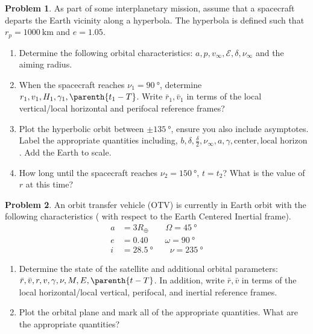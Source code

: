 \documentclass[10pt]{article}
\theoremstyle{definition}
\newtheorem{prob}{Problem}[section]
\newenvironment{subprob}%
{\renewcommand{\theenumi}{\alph{enumi}}\renewcommand{\labelenumi}{(\theenumi)}\begin{enumerate}}%
{\end{enumerate}}%
\begin{document}
\begin{prob}
    As part of some interplanetary mission, assume that a spacecraft departs the Earth vicinity along a hyperbola.
    The hyperbola is defined such that \( r_p = \SI{1000}{\kilo\meter} \) and \( e  = 1.05\).

    \begin{subprob}
        \item Determine the following orbital characteristics: \( a, p, v_\infty, \mathcal{E}, \delta, \nu_\infty \) and the aiming radius.
        \item When the spacecraft reaches \( \nu_1 = \SI{90}{\degree} \), determine \( r_1, v_1, H_1, \gamma_1, \parenth{t_1 - T } \).
            Write \( \bar r_1, \bar v_1 \) in terms of the local vertical/local horizontal and perifocal reference frames?
        \item Plot the hyperbolic orbit between \( \pm \SI{135}{\degree} \), ensure you also include asymptotes.
            Label the appropriate quantities including, \( b, \delta, \frac{\delta}{2} , \nu_\infty, a, \gamma, \text{center} , \text{local horizon} \).
            Add the Earth to scale.
        \item How long until the spacecraft reaches \( \nu_2 = \SI{150}{\degree} \), \( t = t_2\)?
            What is the value of \( r \) at this time?
    \end{subprob}
\end{prob}

\begin{prob}
    An orbit transfer vehicle (OTV) is currently in Earth orbit with the following characteristics ( with respect to the Earth Centered Inertial frame).
    \begin{align*}
        a &= 3 R_{\oplus} \qquad \Omega = \SI{45}{\degree} \\
        e &= 0.40 \qquad \omega = \SI{90}{\degree} \\
        i &= \SI{28.5}{\degree} \qquad \nu = \SI{235}{\degree}
    \end{align*}

    \begin{subprob}
    \item Determine the state of the satellite and additional orbital parameters: \( \bar r, \bar v, r, v, \gamma, \nu, M , E, \parenth{t - T}\).
        In addition, write \( \bar r, \bar v \) in terms of the local horizontal/local vertical, perifocal, and inertial reference frames.
    \item Plot the orbital plane and mark all of the appropriate quantities.
        What are the appropriate quantities?
    \end{subprob}
\end{prob}
\end{document}
